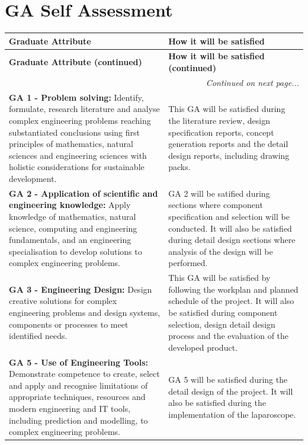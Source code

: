 \chapter{GA Self Assessment}


\begin{longtable}{|p{}|p{}|}

\hline
\textbf{Graduate Attribute} & \textbf{How it will be satisfied} \\
\hline
\endfirsthead

\hline
\textbf{Graduate Attribute (continued)} & \textbf{How it will be satisfied (continued)} \\
\hline
\endhead

\hline
\multicolumn{2}{|r|}{\textit{Continued on next page...}} \\
\hline
\endfoot

\hline
\endlastfoot

\textbf{GA 1 - Problem solving:} Identify, formulate, research literature and analyse complex engineering problems reaching substantiated conclusions using first principles of mathematics, natural sciences and engineering sciences with holistic considerations for sustainable development. 
& 
This GA will be satisfied during the literature review, design specification reports, concept generation reports and the detail design reports, including drawing packs. \\
\hline

\textbf{GA 2 - Application of scientific and engineering knowledge:} Apply knowledge of mathematics, natural science, computing and engineering fundamentals, and an engineering specialisation to develop solutions to complex engineering problems. 
& 
GA 2 will be satified during sections where component specification and selection will be conducted. It will also be satisfied during detail design sections where analysis of the design will be performed.\\
\hline

\textbf{GA 3 - Engineering Design:} Design creative solutions for complex engineering problems and design systems, components or processes to meet identified needs.
& 
This GA will be satisfied by following the workplan and planned schedule of the project. It will also be satisfied during component selection, design detail design process and the evaluation of the developed product. \\
\hline

\textbf{GA 5 - Use of Engineering Tools:} Demonstrate competence to create, select and apply and recognise limitations of appropriate techniques, resources and modern engineering and IT tools, including prediction and modelling, to complex engineering problems.
& 
GA 5 will be satisfied during the detail design of the project. It will also be satisfied during the implementation of the laparoscope. \\
\hline


\end{longtable}
